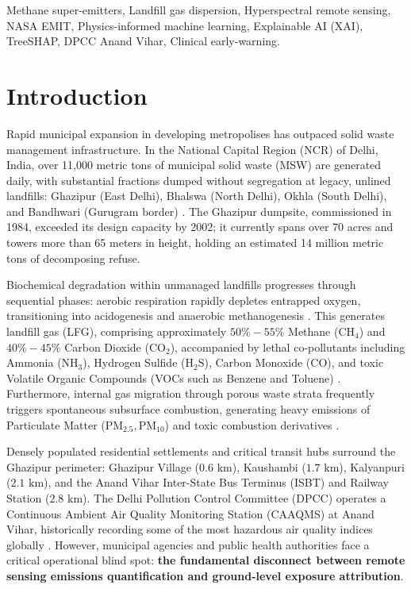 \documentclass[conference]{IEEEtran}
\begin{document}
\begin{IEEEkeywords}
Methane super-emitters, Landfill gas dispersion, Hyperspectral remote sensing, NASA EMIT, Physics-informed machine learning, Explainable AI (XAI), TreeSHAP, DPCC Anand Vihar, Clinical early-warning.
\end{IEEEkeywords}

\section{Introduction}
Rapid municipal expansion in developing metropolises has outpaced solid waste management infrastructure. In the National Capital Region (NCR) of Delhi, India, over 11,000 metric tons of municipal solid waste (MSW) are generated daily, with substantial fractions dumped without segregation at legacy, unlined landfills: Ghazipur (East Delhi), Bhalswa (North Delhi), Okhla (South Delhi), and Bandhwari (Gurugram border) \cite{cpcb2023, kumar2015air}. The Ghazipur dumpsite, commissioned in 1984, exceeded its design capacity by 2002; it currently spans over 70 acres and towers more than 65 meters in height, holding an estimated 14 million metric tons of decomposing refuse.

Biochemical degradation within unmanaged landfills progresses through sequential phases: aerobic respiration rapidly depletes entrapped oxygen, transitioning into acidogenesis and anaerobic methanogenesis \cite{kjeldsen2002present}. This generates landfill gas (LFG), comprising approximately $50\% - 55\%$ Methane ($\text{CH}_4$) and $40\% - 45\%$ Carbon Dioxide ($\text{CO}_2$), accompanied by lethal co-pollutants including Ammonia ($\text{NH}_3$), Hydrogen Sulfide ($\text{H}_2\text{S}$), Carbon Monoxide ($\text{CO}$), and toxic Volatile Organic Compounds (VOCs such as Benzene and Toluene) \cite{bogner2008mitigation, zou2019characterization}. Furthermore, internal gas migration through porous waste strata frequently triggers spontaneous subsurface combustion, generating heavy emissions of Particulate Matter ($\text{PM}_{2.5}, \text{PM}_{10}$) and toxic combustion derivatives \cite{sharma2022variation}.

Densely populated residential settlements and critical transit hubs surround the Ghazipur perimeter: Ghazipur Village ($0.6\text{ km}$), Kaushambi ($1.7\text{ km}$), Kalyanpuri ($2.1\text{ km}$), and the Anand Vihar Inter-State Bus Terminus (ISBT) and Railway Station ($2.8\text{ km}$). The Delhi Pollution Control Committee (DPCC) operates a Continuous Ambient Air Quality Monitoring Station (CAAQMS) at Anand Vihar, historically recording some of the most hazardous air quality indices globally \cite{dpcc2024}. However, municipal agencies and public health authorities face a critical operational blind spot: \textbf{the fundamental disconnect between remote sensing emissions quantification and ground-level exposure attribution}.
\end{document}

